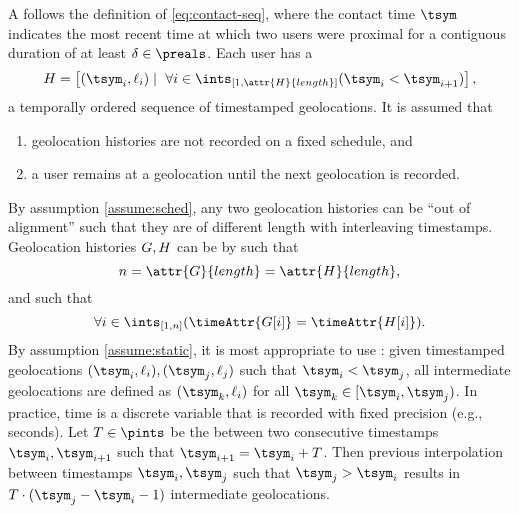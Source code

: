 A  follows the definition of \eqref{eq:contact-seq}, where the contact time $\tsym$ indicates the most recent time at which two users were proximal for a contiguous duration of at least $\delta \in \preals$. Each user has a 
	\begin{equation*}
		\htwo = \left[(\tsym_i, \ell_i) \mid ~\forall i \in \ints_{[1, \attr{\htwo}{length}]} (\tsym_i < \tsym_{i + 1}) \right],
	\end{equation*}
a temporally ordered sequence of timestamped geolocations. It is assumed that
	\begin{enumerate}
		\item geolocation histories are not recorded on a fixed schedule, and \label{assume:sched}
		\item a user remains at a geolocation until the next geolocation is recorded. \label{assume:static}
	\end{enumerate}
By assumption \ref{assume:sched}, any two geolocation histories can be ``out of alignment'' such that they are of different length with interleaving timestamps. Geolocation histories $G, H$ can be  by  such that
	\begin{equation*}
		n = \attr{\hone}{length} = \attr{\htwo}{length},
	\end{equation*}
and  such that
	\begin{equation*}
		\forall i \in \ints_{[1, n]}(\timeAttr{\hone[i]} = \timeAttr{\htwo[i]}).
	\end{equation*}
By assumption \ref{assume:static}, it is most appropriate to use : given timestamped geolocations $(\tsym_i, \ell_i), (\tsym_j, \ell_j)$ such that $\tsym_i < \tsym_j$, all intermediate geolocations are defined as $(\tsym_k, \ell_i)$ for all $\tsym_k \in [\tsym_i, \tsym_j)$. In practice, time is a discrete variable that is recorded with fixed precision (e.g., seconds). Let $T \in \pints$ be the  between two consecutive timestamps $\tsym_i, \tsym_{i + 1}$ such that $\tsym_{i + 1} = \tsym_i + T$. Then previous interpolation between timestamps $\tsym_i, \tsym_j$ such that $\tsym_j > \tsym_i$ results in $T \cdot (\tsym_j - \tsym_i - 1)$ intermediate geolocations.

